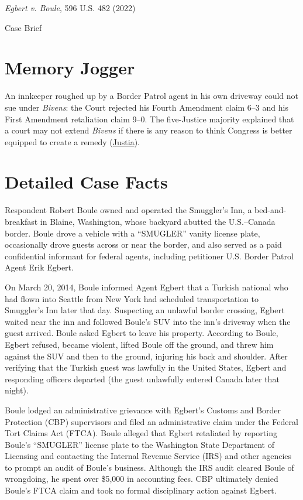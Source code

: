 \documentclass[12pt]{article}
\begin{document}
\begin{center}
{\LARGE \textit{Egbert v. Boule}, 596 U.S. 482 (2022)\par}
\vspace{0.8em}
{\large Case Brief\par}
\end{center}
\vspace{1em}

\section{Memory Jogger}
An innkeeper roughed up by a Border Patrol agent in his own driveway could not sue under \textit{Bivens}: the Court rejected his Fourth Amendment claim 6--3 and his First Amendment retaliation claim 9--0. The five-Justice majority explained that a court may not extend \textit{Bivens} if there is any reason to think Congress is better equipped to create a remedy (\href{https://supreme.justia.com/cases/federal/us/596/21-147/}{Justia}).

\section{Detailed Case Facts}
Respondent Robert Boule owned and operated the Smuggler's Inn, a bed-and-breakfast in Blaine, Washington, whose backyard abutted the U.S.--Canada border. Boule drove a vehicle with a ``SMUGLER'' vanity license plate, occasionally drove guests across or near the border, and also served as a paid confidential informant for federal agents, including petitioner U.S. Border Patrol Agent Erik Egbert.

On March 20, 2014, Boule informed Agent Egbert that a Turkish national who had flown into Seattle from New York had scheduled transportation to Smuggler's Inn later that day. Suspecting an unlawful border crossing, Egbert waited near the inn and followed Boule's SUV into the inn's driveway when the guest arrived. Boule asked Egbert to leave his property. According to Boule, Egbert refused, became violent, lifted Boule off the ground, and threw him against the SUV and then to the ground, injuring his back and shoulder. After verifying that the Turkish guest was lawfully in the United States, Egbert and responding officers departed (the guest unlawfully entered Canada later that night).

Boule lodged an administrative grievance with Egbert's Customs and Border Protection (CBP) supervisors and filed an administrative claim under the Federal Tort Claims Act (FTCA). Boule alleged that Egbert retaliated by reporting Boule's ``SMUGLER'' license plate to the Washington State Department of Licensing and contacting the Internal Revenue Service (IRS) and other agencies to prompt an audit of Boule's business. Although the IRS audit cleared Boule of wrongdoing, he spent over \$5,000 in accounting fees. CBP ultimately denied Boule's FTCA claim and took no formal disciplinary action against Egbert.
\end{document}
